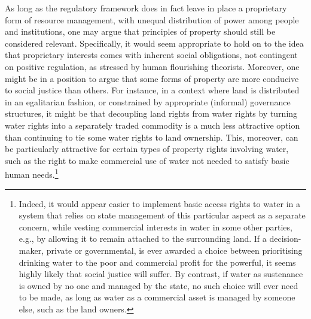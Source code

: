 {As long as the regulatory framework does in fact leave in place a proprietary form of resource management, with unequal distribution of power among people and institutions, one may argue that principles of property should still be considered relevant. Specifically, it would seem appropriate to hold on to the idea that proprietary interests comes with inherent social obligations, not contingent on positive regulation, as stressed by human flourishing theorists. Moreover, one might be in a position to argue that some forms of property are more conducive to social justice than others. For instance, in a context where land is distributed in an egalitarian fashion, or constrained by appropriate (informal) governance structures, it might be that decoupling land rights from water rights by turning water rights into a separately traded commodity is a much less attractive option than continuing to tie some water rights to land ownership. This, moreover, can be particularly attractive for certain types of property rights involving water, such as the right to make commercial use of water not needed to satisfy basic human needs.\footnote{Indeed, it would appear easier to implement basic access rights to water in a system that relies on state management of this particular aspect as a separate concern, while vesting commercial interests in water in some other parties, e.g., by allowing it to remain attached to the surrounding land. If a decision-maker, private or governmental, is ever awarded a choice between prioritising drinking water to the poor and commercial profit for the powerful, it seems highly likely that social justice will suffer. By contrast, if water as sustenance  is owned by no one and managed by the state, no such choice will ever need to be made, as long as water as a commercial asset is managed by someone else, such as the land owners.}}


